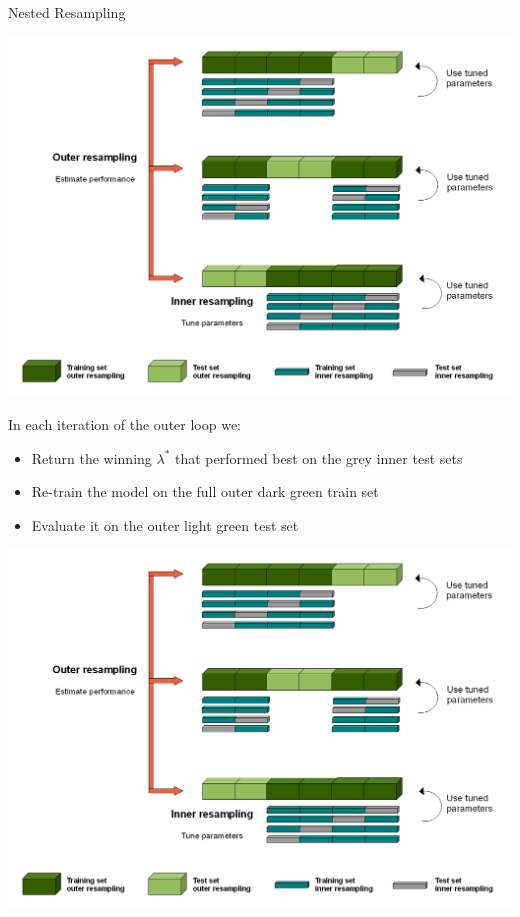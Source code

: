 \begin{frame}[c,allowframebreaks]{Nested Resampling}
    \begin{center}
        \includegraphics[height=0.55\textheight]{Nested_Resampling.png}
    \end{center}

    \framebreak

    \begin{footnotesize}
    In each iteration of the outer loop we:
    \begin{itemize}
    \item Return the winning $\lambda^*$ that performed best on the grey inner test sets
    \item Re-train the model on the full outer dark green train set
    \item Evaluate it on the outer light green test set
    \end{itemize}
    \end{footnotesize}

    \begin{center}
        \includegraphics[height=0.55\textheight]{Nested_Resampling.png}
    \end{center}


\end{frame}
